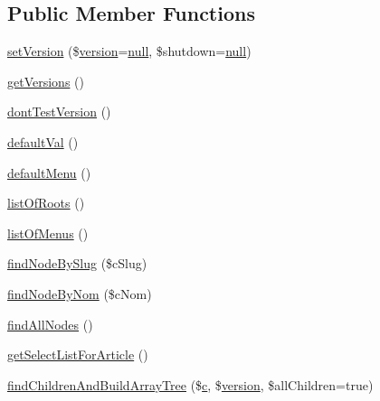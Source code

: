 \subsection*{Public Member Functions}
\begin{DoxyCompactItemize}
\item 
\hyperlink{class_acme_group_1_1_labo_bundle_1_1_entity_1_1categorie_repository_a41984ccb21261a621eb8ba65686ed658}{set\+Version} (\$\hyperlink{class_acme_group_1_1_labo_bundle_1_1_entity_1_1version}{version}=\hyperlink{validate_8js_afb8e110345c45e74478894341ab6b28e}{null}, \$shutdown=\hyperlink{validate_8js_afb8e110345c45e74478894341ab6b28e}{null})
\item 
\hyperlink{class_acme_group_1_1_labo_bundle_1_1_entity_1_1categorie_repository_a3a666668728f4f84c3ac09824ba816ce}{get\+Versions} ()
\item 
\hyperlink{class_acme_group_1_1_labo_bundle_1_1_entity_1_1categorie_repository_a6bbaca88b58bc0ed2b9b3aad8a641ea2}{dont\+Test\+Version} ()
\item 
\hyperlink{class_acme_group_1_1_labo_bundle_1_1_entity_1_1categorie_repository_a2a8ae39c4215cdd7f3249f2dab048370}{default\+Val} ()
\item 
\hyperlink{class_acme_group_1_1_labo_bundle_1_1_entity_1_1categorie_repository_ad2e419aca58685483b3fbe199d94b6ad}{default\+Menu} ()
\item 
\hyperlink{class_acme_group_1_1_labo_bundle_1_1_entity_1_1categorie_repository_a2f84220d93bd870022de42e0f6a39118}{list\+Of\+Roots} ()
\item 
\hyperlink{class_acme_group_1_1_labo_bundle_1_1_entity_1_1categorie_repository_a4f5f5bbf622f35f59644d0a3dae6664f}{list\+Of\+Menus} ()
\item 
\hyperlink{class_acme_group_1_1_labo_bundle_1_1_entity_1_1categorie_repository_a0c522afd2613f4f74f1f0cf68bcb2493}{find\+Node\+By\+Slug} (\$c\+Slug)
\item 
\hyperlink{class_acme_group_1_1_labo_bundle_1_1_entity_1_1categorie_repository_aeac395e4039a855ab210f16990d19468}{find\+Node\+By\+Nom} (\$c\+Nom)
\item 
\hyperlink{class_acme_group_1_1_labo_bundle_1_1_entity_1_1categorie_repository_a9fdbfc699f4d945427e0cb1a0098c7c4}{find\+All\+Nodes} ()
\item 
\hyperlink{class_acme_group_1_1_labo_bundle_1_1_entity_1_1categorie_repository_a5ec8548f667243ee451560901b0df34b}{get\+Select\+List\+For\+Article} ()
\item 
\hyperlink{class_acme_group_1_1_labo_bundle_1_1_entity_1_1categorie_repository_a36870745026aea770ee5c1bf03d84c78}{find\+Children\+And\+Build\+Array\+Tree} (\$\hyperlink{fullpage_2plugin_8min_8js_a92587cc54822a9f38871b2d0e0952da1}{c}, \$\hyperlink{class_acme_group_1_1_labo_bundle_1_1_entity_1_1version}{version}, \$all\+Children=true)

\end{DoxyCompactItemize}
